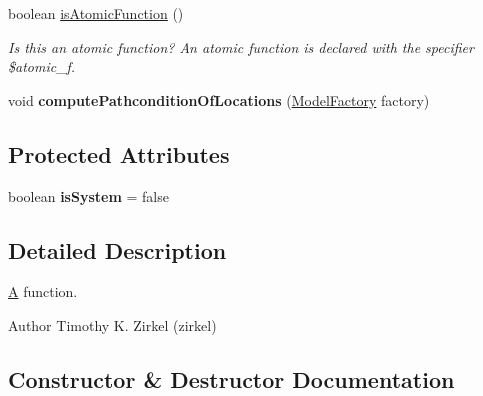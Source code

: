 \begin{DoxyCompactItemize}
boolean \hyperlink{classedu_1_1udel_1_1cis_1_1vsl_1_1civl_1_1model_1_1common_1_1CommonFunction_ab3b0147f4393023d1e366ffc184722ab}{is\+Atomic\+Function} ()
\begin{DoxyCompactList}\small\item\em Is this an atomic function? An atomic function is declared with the specifier {\ttfamily \$atomic\+\_\+f}. \end{DoxyCompactList}\item 
\hypertarget{classedu_1_1udel_1_1cis_1_1vsl_1_1civl_1_1model_1_1common_1_1CommonFunction_afe172cccd9bb628bcc8d8f3c0ddee6c8}{}void {\bfseries compute\+Pathcondition\+Of\+Locations} (\hyperlink{interfaceedu_1_1udel_1_1cis_1_1vsl_1_1civl_1_1model_1_1IF_1_1ModelFactory}{Model\+Factory} factory)\label{classedu_1_1udel_1_1cis_1_1vsl_1_1civl_1_1model_1_1common_1_1CommonFunction_afe172cccd9bb628bcc8d8f3c0ddee6c8}

\end{DoxyCompactItemize}
\subsection*{Protected Attributes}
\begin{DoxyCompactItemize}
\item 
\hypertarget{classedu_1_1udel_1_1cis_1_1vsl_1_1civl_1_1model_1_1common_1_1CommonFunction_a2908d60e243658a34a42544a3671016d}{}boolean {\bfseries is\+System} = false\label{classedu_1_1udel_1_1cis_1_1vsl_1_1civl_1_1model_1_1common_1_1CommonFunction_a2908d60e243658a34a42544a3671016d}

\end{DoxyCompactItemize}


\subsection{Detailed Description}
\hyperlink{structA}{A} function. 

\begin{DoxyAuthor}{Author}
Timothy K. Zirkel (zirkel) 
\end{DoxyAuthor}


\subsection{Constructor \& Destructor Documentation}
\hypertarget{classedu_1_1udel_1_1cis_1_1vsl_1_1civl_1_1model_1_1common_1_1CommonFunction_a9ef146890ebd706ee403a98f5960190a}{}
